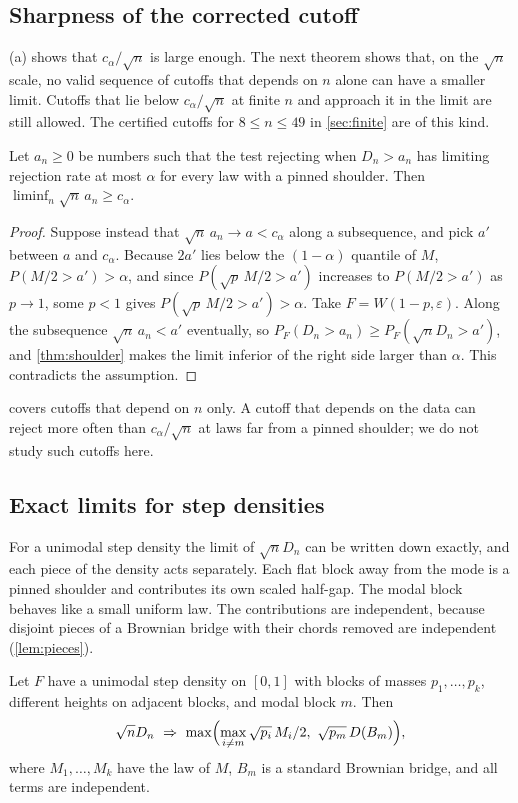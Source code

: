 \subsection{Sharpness of the corrected cutoff}
(a) shows that $c_\alpha/\sqrt n$ is large enough. The next theorem shows that, on the $\sqrt n$ scale, no valid sequence of cutoffs that depends on $n$ alone can have a smaller limit. Cutoffs that lie below $c_\alpha/\sqrt n$ at finite $n$ and approach it in the limit are still allowed. The certified cutoffs for $8\le n\le49$ in \cref{sec:finite} are of this kind.

\begin{theorem}[sharpness]\label{thm:sharp}
Let $a_n\ge0$ be numbers such that the test rejecting when $D_n>a_n$ has limiting rejection rate at most $\alpha$ for every law with a pinned shoulder. Then $\liminf_n\sqrt n\,a_n\ge c_\alpha$.
\end{theorem}
\begin{proof}
Suppose instead that $\sqrt n\,a_n\to a<c_\alpha$ along a subsequence, and pick $a'$ between $a$ and $c_\alpha$. Because $2a'$ lies below the $(1-\alpha)$ quantile of $M$, $P(M/2>a')>\alpha$, and since $P(\sqrt p\,M/2>a')$ increases to $P(M/2>a')$ as $p\to1$, some $p<1$ gives $P(\sqrt p\,M/2>a')>\alpha$. Take $F=W(1-p,\varepsilon)$. Along the subsequence $\sqrt n\,a_n<a'$ eventually, so $P_F(D_n>a_n)\ge P_F(\sqrt nD_n>a')$, and \cref{thm:shoulder} makes the limit inferior of the right side larger than $\alpha$. This contradicts the assumption.
\end{proof}

 covers cutoffs that depend on $n$ only. A cutoff that depends on the data can reject more often than $c_\alpha/\sqrt n$ at laws far from a pinned shoulder; we do not study such cutoffs here.

\subsection{Exact limits for step densities}
For a unimodal step density the limit of $\sqrt nD_n$ can be written down exactly, and each piece of the density acts separately. Each flat block away from the mode is a pinned shoulder and contributes its own scaled half-gap. The modal block behaves like a small uniform law. The contributions are independent, because disjoint pieces of a Brownian bridge with their chords removed are independent (\cref{lem:pieces}).

\begin{proposition}\label{prop:blocks}
Let $F$ have a unimodal step density on $[0,1]$ with blocks of masses $p_1,\dots,p_k$, different heights on adjacent blocks, and modal block $m$. Then
\[
\sqrt nD_n\ \Rightarrow\ \max\Bigl(\max_{i\ne m}\sqrt{p_i}\,M_i/2,\ \sqrt{p_m}\,D(B_m)\Bigr),
\]
where $M_1,\dots,M_k$ have the law of $M$, $B_m$ is a standard Brownian bridge, and all terms are independent.
\end{proposition}

